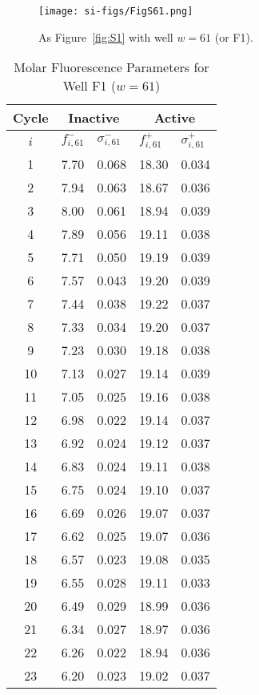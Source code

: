                 \begin{figure}
                    \centering
                    \texttt{[image: si-figs/FigS61.png]}
                    \caption{
                        As Figure~\ref{fig:S1} with well $w=61$ (or F1).
                    }
                \end{figure}
                \clearpage
    \begin{table}
        \caption{Molar Fluorescence Parameters for Well F1 ($w=61$)}
        \centering
        \begin{tabular}{c|ll|ll}
            Cycle & \multicolumn{2}{c|}{Inactive} & \multicolumn{2}{c}{Active} \\
            \hline
            $i$ & $f_{i,61}^{-}$ & $\sigma_{i,61}^{-}$ &  $f_{i,61}^{+}$ & $\sigma_{i,61}^{+}$ \\
            \hline
    1 & 7.70 & 0.068 & 18.30 & 0.034 \\
2 & 7.94 & 0.063 & 18.67 & 0.036 \\
3 & 8.00 & 0.061 & 18.94 & 0.039 \\
4 & 7.89 & 0.056 & 19.11 & 0.038 \\
5 & 7.71 & 0.050 & 19.19 & 0.039 \\
6 & 7.57 & 0.043 & 19.20 & 0.039 \\
7 & 7.44 & 0.038 & 19.22 & 0.037 \\
8 & 7.33 & 0.034 & 19.20 & 0.037 \\
9 & 7.23 & 0.030 & 19.18 & 0.038 \\
10 & 7.13 & 0.027 & 19.14 & 0.039 \\
11 & 7.05 & 0.025 & 19.16 & 0.038 \\
12 & 6.98 & 0.022 & 19.14 & 0.037 \\
13 & 6.92 & 0.024 & 19.12 & 0.037 \\
14 & 6.83 & 0.024 & 19.11 & 0.038 \\
15 & 6.75 & 0.024 & 19.10 & 0.037 \\
16 & 6.69 & 0.026 & 19.07 & 0.037 \\
17 & 6.62 & 0.025 & 19.07 & 0.036 \\
18 & 6.57 & 0.023 & 19.08 & 0.035 \\
19 & 6.55 & 0.028 & 19.11 & 0.033 \\
20 & 6.49 & 0.029 & 18.99 & 0.036 \\
21 & 6.34 & 0.027 & 18.97 & 0.036 \\
22 & 6.26 & 0.022 & 18.94 & 0.036 \\
23 & 6.20 & 0.023 & 19.02 & 0.037 \\

\end{tabular}
\end{table}
